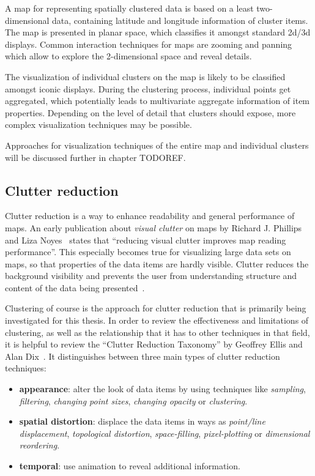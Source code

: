 A map for representing spatially clustered data is based on a least two-dimensional data, containing latitude and longitude information of cluster items. The map is presented in planar space, which classifies it amongst standard 2d/3d displays. Common interaction techniques for maps are zooming and panning which allow to explore the 2-dimensional space and reveal details.

The visualization of individual clusters on the map is likely to be classified amongst iconic displays. During the clustering process, individual points get aggregated, which potentially leads to multivariate aggregate information of item properties. Depending on the level of detail that clusters should expose, more complex visualization techniques may be possible. 

Approaches for visualization techniques of the entire map and individual clusters will be discussed further in chapter TODOREF.

\subsection{Clutter reduction}

Clutter reduction is a way to enhance readability and general performance of maps. An early publication about \textit{visual clutter} on maps by Richard J. Phillips and Liza Noyes~\cite{phillips82clutter} states that ``reducing visual clutter improves map reading performance''. This especially becomes true for visualizing large data sets on maps, so that properties of the data items are hardly visible. Clutter reduces the background visibility and prevents the user from understanding structure and content of the data being presented~\cite{harvey2008primer, Delort10vis}.

Clustering of course is the approach for clutter reduction that is primarily being investigated for this thesis. In order to review the effectiveness and limitations of clustering, as well as the relationship that it has to other techniques in that field, it is helpful to review the ``Clutter Reduction Taxonomy'' by Geoffrey Ellis and Alan Dix~\cite{ellis08clutter}. It distinguishes between three main types of clutter reduction techniques:

\begin{itemize}

\item \textbf{appearance}: alter the look of data items by using techniques like \textit{sampling}, \textit{filtering}, \textit{changing point sizes}, \textit{changing opacity} or \textit{clustering}.

\item \textbf{spatial distortion}: displace the data items in ways as \textit{point/line displacement}, \textit{topological distortion}, \textit{space-filling}, \textit{pixel-plotting} or \textit{dimensional reordering}.

\item \textbf{temporal}: use animation to reveal additional information.

\end{itemize}

